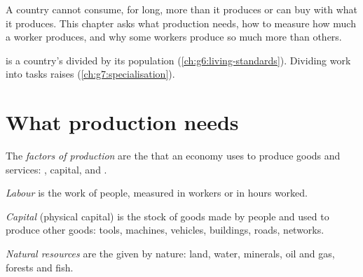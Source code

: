 A country cannot consume, for long, more than it produces or can buy with what it produces.
This chapter asks what production needs, how to measure how much a worker produces, and why
some workers produce so much more than others.

\begin{recall}
 is a country's  divided by its population
(\cref{ch:g6:living-standards}). Dividing work into tasks raises 
(\cref{ch:g7:specialisation}).
\end{recall}

\section{What production needs}

\begin{definition}\label{def:g8:production-and-productivity:factors}
The \emph{factors of production} are the  that an economy
uses to produce goods and services: , capital,  and .
\end{definition}

\begin{definition}[Labour]\label{def:g8:production-and-productivity:labour}
\emph{Labour} is the work of people, measured in workers or in hours worked.
\end{definition}

\begin{definition}[Capital]\label{def:g8:production-and-productivity:capital}
\emph{Capital} (physical capital) is the stock of goods made by people
and used to produce other goods: tools, machines, vehicles, buildings, roads, networks.
\end{definition}

\begin{definition}\label{def:g8:production-and-productivity:natural-resources}
\emph{Natural resources} are the  given by nature: land, water,
minerals, oil and gas, forests and fish.
\end{definition}

